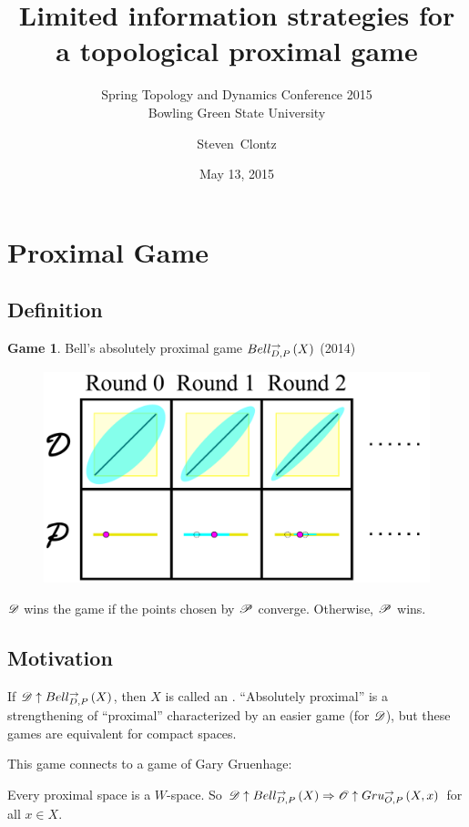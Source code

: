 \documentclass{beamer}
\title
{Limited information strategies for a topological proximal game}
\subtitle
{Spring Topology and Dynamics Conference 2015\\
Bowling Green State University} %
\author%
{Steven~Clontz}%
\institute[Auburn, AL] %
{
  Auburn, AL}
\date[15-05-13] %
{May 13, 2015}
\theoremstyle{definition}
\newtheorem{game}[theorem]{Game}
\begin{document}
\newcommand{\vspacing}{\vspace{1em}}
\newcommand{\vpause}{\pause\vspacing}

\begin{frame}
  \titlepage
\end{frame}


\section{Proximal Game}

\subsection{Definition}

\begin{frame}
  \small
  \begin{game}
  Bell's absolutely proximal game $Bell_{D,P}^{\to}\left({X}\right)$ \cite{MR3239205} (2014)
    \begin{figure}
      \includegraphics[width=0.6\linewidth]{proximalGamePrime.pdf}
    \end{figure}

  $\mathscr{D}$ wins the game if the points chosen by $\mathscr{P}$ converge.
  Otherwise, $\mathscr{P}$ wins.
  \end{game}
\end{frame}

\subsection{Motivation}

\begin{frame}
  If $\mathscr{D}\uparrow Bell_{D,P}^{\to}\left({X}\right)$, then $X$ is called an
  .
  ``Absolutely proximal'' is a strengthening of ``proximal'' characterized
  by an easier game (for \(\mathscr{D}\)), but these games are equivalent for
  compact spaces.

  \vpause

  This game connects to a game of Gary Gruenhage: \cite{MR3239205}

  \begin{theorem}
    Every proximal space is a $W$-space. So
    $\mathscr{D}\uparrow Bell_{D,P}^{\to}\left({X}\right) \Rightarrow \mathscr{O}\uparrow Gru_{O,P}^{\to}\left({X},{x}\right)$
    for all $x\in X$.
  \end{theorem}
\end{frame}
\end{document}
